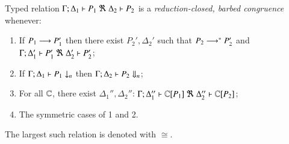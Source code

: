 \begin{definition}
\label{def:rc}
	Typed relation
	$\horel{\Gamma}{\Delta_1}{P_1}{\ \Re\ }{\Delta_2}{P_2}$
	is a {\em reduction-closed, barbed congruence} whenever:
	\begin{enumerate}[1)]
		\item	If $P_1 \longrightarrow P_1'$ then there exist $P_2', \Delta_2'$ such that $P_2 \longrightarrow^* P_2'$ and
			$\horel{\Gamma}{\Delta_1'}{P_1'}{\ \Re\ }{\Delta_2'}{P_2'}$; 

			\item	If $\Gamma;\Delta_1 \vdash P_1 \downarrow_{n}$ then $\Gamma;\Delta_2 \vdash P_2 \Downarrow_{n}$; %


		\item	For all ${\Bbb C}$, there exist $\Delta_1'',\Delta_2''$: $\horel{\Gamma}{\Delta_1''}{\context{\C}{P_1}}{\ \Re\ }{\Delta_2''}{\context{\C}{P_2}}$;
		                      \item	The symmetric cases of 1 and 2.                
	\end{enumerate}
	The largest such relation is denoted with $\cong$.
\end{definition}

